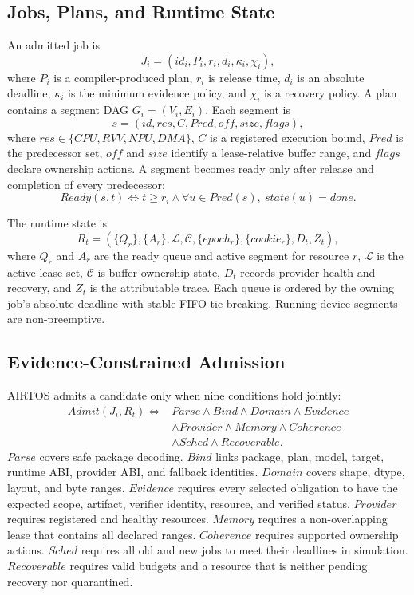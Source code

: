\documentclass[lettersize,journal]{IEEEtran}
\begin{document}
\subsection{Jobs, Plans, and Runtime State}
An admitted job is
\begin{equation}
J_i=(id_i,P_i,r_i,d_i,\kappa_i,\chi_i),
\end{equation}
where $P_i$ is a compiler-produced plan, $r_i$ is release time, $d_i$ is an
absolute deadline, $\kappa_i$ is the minimum evidence policy, and $\chi_i$ is
a recovery policy. A plan contains a segment DAG $G_i=(V_i,E_i)$. Each segment
is
\begin{equation}
s=(id,res,C,Pred,off,size,flags),
\end{equation}
where $res\in\{CPU,RVV,NPU,DMA\}$, $C$ is a registered execution bound,
$Pred$ is the predecessor set, $off$ and $size$ identify a lease-relative
buffer range, and $flags$ declare ownership actions. A segment becomes ready
only after release and completion of every predecessor:
\begin{equation}
Ready(s,t)\Leftrightarrow t\ge r_i\land
\forall u\in Pred(s),\ state(u)=done.
\end{equation}

The runtime state is
\begin{equation}
R_t=(\{Q_r\},\{A_r\},\mathcal L,\mathcal C,
\{epoch_r\},\{cookie_r\},D_t,Z_t),
\end{equation}
where $Q_r$ and $A_r$ are the ready queue and active segment for resource $r$,
$\mathcal L$ is the active lease set, $\mathcal C$ is buffer ownership state,
$D_t$ records provider health and recovery, and $Z_t$ is the attributable
trace. Each queue is ordered by the owning job's absolute deadline with stable
FIFO tie-breaking. Running device segments are non-preemptive.

\subsection{Evidence-Constrained Admission}
AIRTOS admits a candidate only when nine conditions hold jointly:
\begin{align}
Admit(J_i,R_t)\Leftrightarrow{}&Parse\land Bind\land Domain\land Evidence
\nonumber\\
&\land Provider\land Memory\land Coherence\nonumber\\
&\land Sched\land Recoverable.
\label{eq:admit}
\end{align}
$Parse$ covers safe package decoding. $Bind$ links package, plan, model,
target, runtime ABI, provider ABI, and fallback identities. $Domain$ covers
shape, dtype, layout, and byte ranges. $Evidence$ requires every selected
obligation to have the expected scope, artifact, verifier identity, resource,
and verified status. $Provider$ requires registered and healthy resources.
$Memory$ requires a non-overlapping lease that contains all declared ranges.
$Coherence$ requires supported ownership actions. $Sched$ requires all old and
new jobs to meet their deadlines in simulation. $Recoverable$ requires valid
budgets and a resource that is neither pending recovery nor quarantined.
\end{document}
